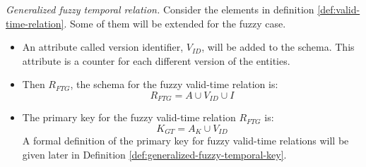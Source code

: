 \documentclass{llncs}
\newcommand{\N}{\operatorname{N}}
\begin{document}
\begin{definition}
\emph{Generalized fuzzy temporal relation.}
\label{def:fuzzy-temporal-relation}
Consider the elements in definition \ref{def:valid-time-relation}. Some of them will be extended for the fuzzy case.

\begin{itemize}
\item An attribute called version identifier, $V_{ID}$, will be added to the schema. This attribute is a counter for each different version of the entities. 



\item Then $R_{FTG}$, the schema for the fuzzy valid-time relation is:
\begin{equation}
 \label{eq:fuzzy-valid-time-relation}
R_{FTG} = A \cup V_{ID} \cup  I
\end{equation}
\item The primary key for the fuzzy valid-time relation $R_{FTG}$ is:
\begin{equation}
 \label{eq:fuzzy-valid-time-temporal-pk}
K_{GT} = A_K \cup V_{ID}
\end{equation}
A formal definition of the primary key for fuzzy valid-time relations will be given later in Definition \ref{def:generalized-fuzzy-temporal-key}.



\end{itemize}
\end{definition}
\end{document}
